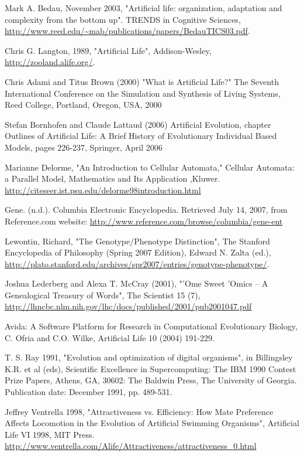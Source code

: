 \documentclass[a4paper,12pt]{report}
\begin{document}
\begin{thebibliography}{99}

Mark A. Bedau, November 2003, "Artificial life: organization, adaptation and complexity from the bottom up". TRENDS in Cognitive Sciences, \url{http://www.reed.edu/~mab/publications/papers/BedauTICS03.pdf}.

Chris G. Langton, 1989,  "Artificial Life", Addison-Wesley, \url{http://zooland.alife.org/}.

Chris Adami and Titus Brown (2000) "What is Artificial Life?" The Seventh International Conference on the Simulation and Synthesis of Living Systems, Reed College, Portland, Oregon, USA, 2000

Stefan Bornhofen and Claude Lattaud (2006) Artificial Evolution, chapter Outlines of Artificial Life: A Brief History of Evolutionary Individual Based Models, pages 226-237, Springer, April 2006

Marianne Delorme, "An Introduction to Cellular Automata," Cellular Automata: a Parallel Model, Mathematics and Its Application ,Kluwer. \url{http://citeseer.ist.psu.edu/delorme98introduction.html} 

Gene. (n.d.). Columbia Electronic Encyclopedia. Retrieved July 14, 2007, from Reference.com website: \url{http://www.reference.com/browse/columbia/gene-ent}

Lewontin, Richard, "The Genotype/Phenotype Distinction", The Stanford Encyclopedia of Philosophy (Spring 2007 Edition), Edward N. Zalta (ed.), \url{http://plato.stanford.edu/archives/spr2007/entries/genotype-phenotype/}.

Joshua Lederberg and Alexa T. McCray (2001), "'Ome Sweet 'Omics -- A Genealogical Treasury of Words", The Scientist 15 (7), \url{http://lhncbc.nlm.nih.gov/lhc/docs/published/2001/pub2001047.pdf}

Avida: A Software Platform for Research in Computational Evolutionary Biology,
C. Ofria and C.O. Wilke, Artificial Life 10 (2004) 191-229.

T. S. Ray 1991, "Evolution and optimization of digital organisms", in Billingsley K.R. et al (eds), Scientific Excellence in Supercomputing: The IBM 1990 Contest Prize Papers, Athens, GA, 30602: The Baldwin Press, The University of Georgia. Publication date: December 1991, pp. 489-531.

Jeffrey Ventrella 1998, "Attractiveness vs. Efficiency: How Mate Preference Affects Locomotion in the Evolution of Artificial Swimming Organisms", Artificial Life VI 1998, MIT Press. \url{http://www.ventrella.com/Alife/Attractiveness/attractiveness_0.html}
 

\end{thebibliography}
\end{document}
